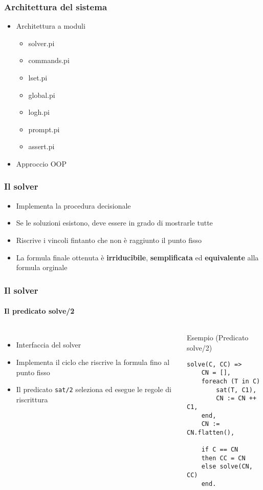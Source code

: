 \documentclass{beamer}
\begin{document}
\begin{frame}
  \frametitle{Architettura del sistema}
  \begin{itemize}
  \item Architettura a moduli
    \begin{itemize}
    \item solver.pi
    \item commands.pi
    \item lset.pi
    \item global.pi
    \item log\textunderscore h.pi
    \item prompt.pi
    \item assert.pi
    \end{itemize}
  \item Approccio OOP
  \end{itemize}
\end{frame}


\begin{frame}
  \frametitle{Il solver}
  \begin{itemize}
  \item Implementa la procedura decisionale \satset{}
  \item Se le soluzioni esistono, deve essere in grado di mostrarle tutte
  \item Riscrive i vincoli fintanto che non è raggiunto il punto fisso
  \item La formula finale ottenuta è \textbf{irriducibile}, \textbf{semplificata} ed \textbf{equivalente} alla formula orginale
  \end{itemize}
\end{frame}


\begin{frame}[fragile]
  \frametitle{Il solver}
  \framesubtitle{Il predicato solve/2}
  
  \begin{columns}[c]
    \begin{itemize}
    \item Interfaccia del solver
    \item Implementa il ciclo che riscrive la formula fino al punto fisso
    \item Il predicato \texttt{sat/2} seleziona ed esegue le regole di riscrittura
    \end{itemize}

    \begin{exampleblock}{Esempio (Predicato solve/2)}
\begin{verbatim}
solve(C, CC) =>
    CN = [],
    foreach (T in C)
        sat(T, C1),
        CN := CN ++ C1,
    end,
    CN := CN.flatten(),
    
    if C == CN
    then CC = CN
    else solve(CN, CC)
    end.
\end{verbatim}
    \end{exampleblock}	
  \end{columns}
\end{frame}
\end{document}
